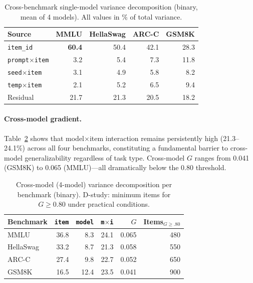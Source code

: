 \documentclass[letterpaper]{article}
\newcommand{\gcoeff}{\ensuremath{G}}
\newcommand{\pct}{\%}
\begin{document}
\begin{table}[t]
\centering
\caption{Cross-benchmark single-model variance decomposition (binary, mean of 4 models). All values in \pct{} of total variance.}
\label{tab:gradient-single}
\small
\begin{tabular}{lrrrr}
\toprule
Source & MMLU & HellaSwag & ARC-C & GSM8K \\
\midrule
\texttt{item\_id}            & \textbf{60.4} & 50.4 & 42.1 & 28.3 \\
\texttt{prompt$\times$item}  & 3.2  & 5.4  & 7.3  & 11.8 \\
\texttt{seed$\times$item}    & 3.1  & 4.9  & 5.8  & 8.2  \\
\texttt{temp$\times$item}    & 2.1  & 5.2  & 6.5  & 9.4  \\
Residual                      & 21.7 & 21.3 & 20.5 & 18.2 \\
\bottomrule
\end{tabular}
\end{table}

\paragraph{Cross-model gradient.}
Table~\ref{tab:gradient-cross} shows that model$\times$item interaction remains persistently high (21.3--24.1\pct{}) across all four benchmarks, constituting a fundamental barrier to cross-model generalizability regardless of task type.
Cross-model $\gcoeff{}$ ranges from 0.041 (GSM8K) to 0.065 (MMLU)---all dramatically below the 0.80 threshold.

\begin{table}[t]
\centering
\caption{Cross-model (4-model) variance decomposition per benchmark (binary). D-study: minimum items for $\gcoeff{}\geq 0.80$ under practical conditions.}
\label{tab:gradient-cross}
\small
\begin{tabular}{lrrrrr}
\toprule
Benchmark & \texttt{item} & \texttt{model} & \texttt{m$\times$i} & $\gcoeff{}$ & Items$_{\gcoeff{}\geq.80}$ \\
\midrule
MMLU      & 36.8 & 8.3  & 24.1 & 0.065 & 480 \\
HellaSwag & 33.2 & 8.7  & 21.3 & 0.058 & 550 \\
ARC-C     & 27.4 & 9.8  & 22.7 & 0.052 & 650 \\
GSM8K     & 16.5 & 12.4 & 23.5 & 0.041 & 900 \\
\bottomrule
\end{tabular}
\end{table}
\end{document}
